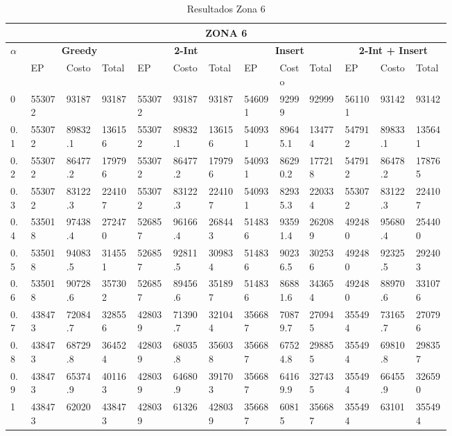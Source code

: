 \documentclass[conference]{IEEEtran}
\begin{document}
\begin{table*}[t]
\caption{Resultados Zona 6}
\centering
\begin{tabular}{|p{0.03\linewidth}|p{0.06\linewidth}|p{0.06\linewidth}|p{0.06\linewidth}|p{0.06\linewidth}|p{0.06\linewidth}|p{0.06\linewidth}|p{0.06\linewidth}|p{0.05\linewidth}|p{0.06\linewidth}|p{0.06\linewidth}|p{0.06\linewidth}|p{0.06\linewidth}|}
\hline
\multicolumn{13}{|c|}{\textbf{ZONA 6}} \\ 
\hline

\multirow{2}{*}{\textbf{$\alpha$}}  & \multicolumn{3}{|c|}{\textbf{Greedy}} & \multicolumn{3}{|c|}{\textbf{2-Int}} & \multicolumn{3}{|c|}{\textbf{Insert}} & \multicolumn{3}{|c|}{\textbf{2-Int + Insert}} \\

\cline{2-13}
& EP & Costo & Total & EP & Costo & Total & EP & Costo & Total & EP & Costo & Total  \\
\hline
0 & 553072 & 93187 & 93187 & 553072 & 93187 & 93187 & 546091 & 92999 & 92999 & 561101 & 93142 & 93142  \\
\hline

0.1 & 553072 & 89832.1 & 136156 & 553072 & 89832.1 & 136156 & 540931 & 89645.1 & 134774 & 547912 & 89833.1 & 135641  \\
\hline

0.2 & 553072 & 86477.2 & 179796 & 553072 & 86477.2 & 179796 & 540931 & 86290.2 & 177218 & 547912 & 86478.2 & 178765  \\
\hline

0.3 & 553072 & 83122.3 & 224107 & 553072 & 83122.3 & 224107 & 540931 & 82935.3 & 220334 & 553072 & 83122.3 & 224107  \\
\hline

0.4 & 535018 & 97438.4 & 272470 & 526857 & 96166.4 & 268443 & 514836 & 93591.4 & 262089 & 492480 & 95680.4 & 254400  \\
\hline

0.5 & 535018 & 94083.5 & 314551 & 526857 & 92811.5 & 309834 & 514836 & 90236.5 & 302536 & 492480 & 92325.5 & 292403  \\
\hline

0.6 & 535018 & 90728.6 & 357302 & 526857 & 89456.6 & 351897 & 514836 & 86881.6 & 343654 & 492480 & 88970.6 & 331076  \\
\hline

0.7 & 438473 & 72084.7 & 328556 & 428039 & 71390.7 & 321044 & 356687 & 70879.7 & 270945 & 355494 & 73165.7 & 270796  \\
\hline

0.8 & 438473 & 68729.8 & 364524 & 428039 & 68035.8 & 356038 & 356687 & 67524.8 & 298855 & 355494 & 69810.8 & 298357  \\
\hline

0.9 & 438473 & 65374.9 & 401163 & 428039 & 64680.9 & 391703 & 356687 & 64169.9 & 327435 & 355494 & 66455.9 & 326590  \\
\hline

1 & 438473 & 62020 & 438473 & 428039 & 61326 & 428039 & 356687 & 60815 & 356687 & 355494 & 63101 & 355494  \\
\hline
\end{tabular}
\end{table*}
\end{document}
